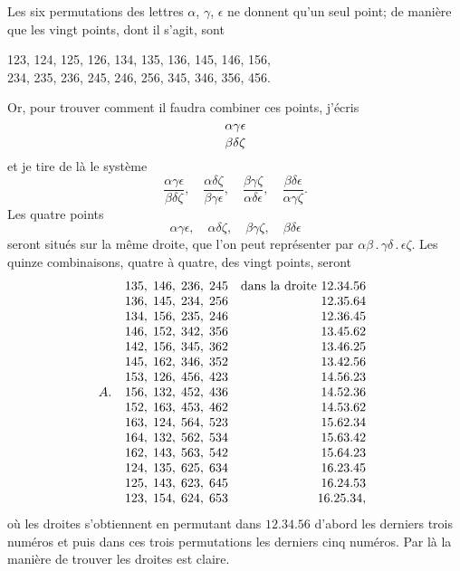 \documentclass[11pt]{article}
\begin{document}
\bigskip

Les six permutations des lettres $\alpha$, $\gamma$, $\epsilon$ ne donnent qu'un seul point; de mani\`ere
que les vingt points, dont il s'agit, sont
\begin{center}
123, 124, 125, 126, 134, 135, 136, 145, 146, 156,\\
234, 235, 236, 245, 246, 256, 345, 346, 356, 456.
\end{center}

\noindent Or, pour trouver comment il faudra combiner ces points, j'\'ecris
\[
\genfrac{}{}{0pt}{}{\alpha\gamma\epsilon}{\beta\delta\zeta}
\]
et je tire de l\`a le syst\`eme
\[
\frac{\alpha\gamma\epsilon}{\beta\delta\zeta},\quad \frac{\alpha\delta\zeta}{\beta\gamma\epsilon},\quad \frac{\beta\gamma\zeta}{\alpha\delta\epsilon},\quad \frac{\beta\delta\epsilon}{\alpha\gamma\zeta}.
\]
Les quatre points
\[
\alpha\gamma\epsilon,\quad \alpha\delta\zeta,\quad \beta\gamma\zeta,\quad \beta\delta\epsilon
\]
seront situ\'es sur la m\^eme droite, que l'on peut repr\'esenter par $\alpha\beta\,.\,\gamma\delta\,.\,\epsilon\zeta$. Les quinze
combinaisons, quatre \`a quatre, des vingt points, seront
\[
A.\;\;\begin{array}{l@{\quad}r}
135,\;146,\;236,\;245 & \text{dans la droite } 12.34.56\\
136,\;145,\;234,\;256 & 12.35.64\\
134,\;156,\;235,\;246 & 12.36.45\\
146,\;152,\;342,\;356 & 13.45.62\\
142,\;156,\;345,\;362 & 13.46.25\\
145,\;162,\;346,\;352 & 13.42.56\\
153,\;126,\;456,\;423 & 14.56.23\\
156,\;132,\;452,\;436 & 14.52.36\\
152,\;163,\;453,\;462 & 14.53.62\\
163,\;124,\;564,\;523 & 15.62.34\\
164,\;132,\;562,\;534 & 15.63.42\\
162,\;143,\;563,\;542 & 15.64.23\\
124,\;135,\;625,\;634 & 16.23.45\\
125,\;143,\;623,\;645 & 16.24.53\\
123,\;154,\;624,\;653 & 16.25.34,
\end{array}
\]
o\`u les droites s'obtiennent en permutant dans $12.34.56$ d'abord les derniers trois
num\'eros et puis dans ces trois permutations les derniers cinq num\'eros. Par l\`a la
mani\`ere de trouver les droites est claire.
\end{document}
